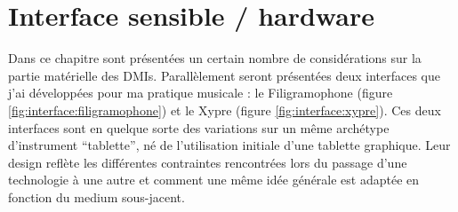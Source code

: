 %
\chapter{Interface sensible / hardware}
\label{ch:interfaces}



Dans ce chapitre sont présentées un certain nombre de considérations sur la partie matérielle des \glspl{DMI}. Parallèlement seront présentées deux interfaces que j'ai développées pour ma pratique musicale : le Filigramophone (figure \ref{fig:interface:filigramophone}) et le Xypre (figure \ref{fig:interface:xypre}). Ces deux interfaces sont en quelque sorte des variations sur un même archétype d'instrument ``tablette'', né de l'utilisation initiale d'une tablette graphique. Leur design reflète les différentes contraintes rencontrées lors du passage d'une technologie à une autre et comment une même idée générale est adaptée en fonction du medium sous-jacent.

